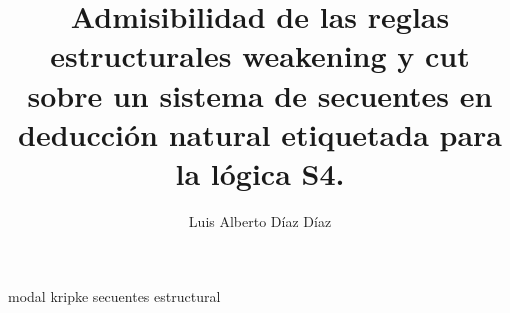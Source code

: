 \documentclass[12pt,twoside,a4paper]{report}
\begin{document}
\title{Admisibilidad de las reglas estructurales weakening y cut sobre un sistema de secuentes en deducción natural etiquetada para la lógica S4.}

\author{Luis Alberto Díaz Díaz}

\maketitle


{modal}
{kripke}
{secuentes}
{estructural}
\end{document}
